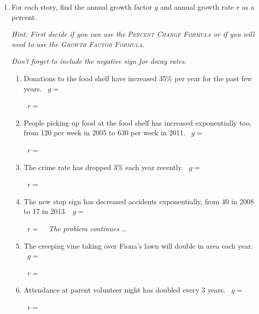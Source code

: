 \begin{enumerate}
\newpage %

\item For each story, find the annual growth factor $g$ and annual growth rate $r$ as a percent.  

\emph{Hint:  First decide if you can use the \textsc{Percent Change Formula} or if you will need to use the \textsc{Growth Factor Formula}.}

\emph{Don't forget to include the negative sign for decay rates.}
\begin{enumerate}
\item  Donations to the food shelf have increased 35\% per year for the past few years. 
\vfill
~\hfill $g=$ \hspace{1in} 

~\hfill $r=$ \hspace{1in} 
\vfill
\item  People picking up food at the food shelf has increased exponentially too, from 120 per week in 2005 to 630 per week in 2011. \vfill
~\hfill $g=$ \hspace{1in} 

~\hfill $r=$ \hspace{1in} 
\vfill

\item The crime rate has dropped 3\% each year recently. \vfill
~\hfill $g=$ \hspace{1in} 

~\hfill $r=$ \hspace{1in} 
\vfill

\item The new stop sign has decreased accidents exponentially, from 40 in 2008 to 17 in 2013. \vfill
~\hfill $g=$ \hspace{1in} 

~\hfill $r=$ \hspace{1in} 
\vfill
\newpage %
~\hspace{-.5in} \emph{The problem continues \ldots}

\item The creeping vine taking over Fiona's lawn will double in area each year. \vfill
~\hfill $g=$ \hspace{1in} 

~\hfill $r=$ \hspace{1in} 
\vfill
\item Attendance at parent volunteer night has doubled every 3 years.\vfill
~\hfill $g=$ \hspace{1in} 

~\hfill $r=$ \hspace{1in} 
\vfill


\end{enumerate}
\end{enumerate}
